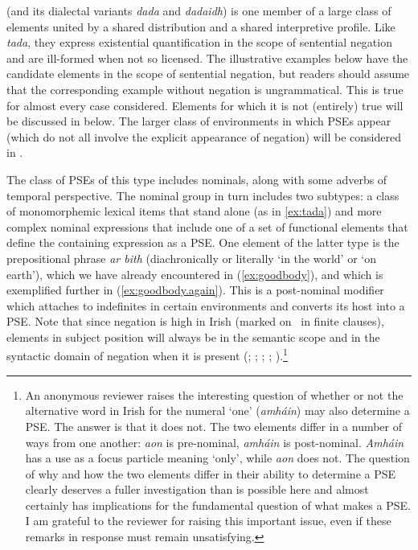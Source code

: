 \documentclass[output=paper,colorlinks,citecolor=brown]{langscibook}
\begin{document}
 (and its dialectal variants {\itshape dada} and {\itshape dadaidh}) is one member of a large class of elements united by a shared distribution and a shared interpretive profile. Like {\itshape tada}, they express existential quantification in the scope of sentential negation and are ill-formed when not so licensed.  The illustrative examples below have the candidate elements in the scope of sentential negation, but readers should assume that the corresponding example without negation is ungrammatical. This is true for almost every case considered. Elements for which it is not (entirely) true will be discussed in  below. The larger class of environments in which PSEs appear (which do not all involve the explicit appearance of negation) will be considered in .

The class of PSEs of this type includes nominals, along with some adverbs of temporal perspective. The nominal group in turn includes two subtypes: a class of monomorphemic lexical items that stand alone (as in \ref{ex:tada}) and more complex nominal expressions that include one of a set of functional elements that define the containing expression as a PSE. One element of the latter type is the prepositional phrase \textit{ar bith} (diachronically or literally `in the world' or `on earth'), which we have already encountered in (\ref{ex:goodbody}), and which is exemplified further in (\ref{ex:goodbody.again}). This is a post-nominal modifier which attaches to indefinites in certain environments and converts its host into a PSE.  Note that since negation is high in Irish (marked on \C\ in finite clauses), elements in subject position will always be in the semantic scope and in the syntactic domain of negation when it is present (\cite{jm:acquaviva:96}; \cite{duffield:95}; \cite{mccloskey:96a}; \cite{mccloskey:01b}; \cite{mccloskey:17}).\footnote{An anonymous reviewer raises the\label{fn:amhain} interesting question of whether or not the alternative word in Irish for the numeral `one' (\textit{amháin}) may also determine a PSE. The answer is that it does not. The two elements differ in a number of ways from one another: \textit{aon} is pre-nominal, \textit{amháin} is post-nominal. \textit{Amháin} has a use as a focus particle meaning `only', while \textit{aon} does not. The question of why and how the two elements differ in their ability to determine a PSE clearly deserves a fuller investigation than is possible here and almost certainly has implications for the fundamental question of what makes a PSE. I am grateful to the reviewer for raising this important issue, even if these remarks in response must remain unsatisfying.}
\end{document}
